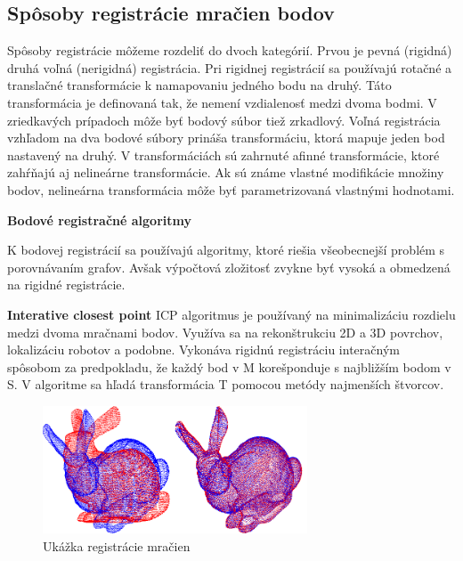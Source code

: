 \subsection{Spôsoby registrácie mračien bodov}

Spôsoby registrácie môžeme rozdeliť do dvoch kategórií. Prvou je pevná (rigidná) druhá voľná (nerigidná) registrácia. Pri rigidnej registrácií sa používajú rotačné a translačné transformácie k namapovaniu jedného bodu na druhý. Táto transformácia je definovaná tak, že nemení vzdialenosť medzi dvoma bodmi. V zriedkavých prípadoch môže byť bodový súbor tiež zrkadlový. Voľná registrácia vzhľadom na dva bodové súbory prináša transformáciu, ktorá mapuje jeden bod nastavený na druhý. V transformáciách sú zahrnuté afinné transformácie, ktoré zahŕňajú aj nelineárne transformácie. Ak sú známe vlastné modifikácie množiny bodov, nelineárna transformácia môže byť parametrizovaná vlastnými hodnotami.\newline

\textbf{Bodové registračné algoritmy}

K bodovej registrácií sa používajú algoritmy, ktoré riešia všeobecnejší problém s porovnávaním grafov. Avšak výpočtová zložitosť zvykne byť vysoká a obmedzená na rigidné registrácie.\newline


\textbf{Interative closest point}
ICP algoritmus je používaný na minimalizáciu rozdielu medzi dvoma mračnami bodov. Využíva sa na rekonštrukciu 2D a 3D povrchov, lokalizáciu robotov a podobne. Vykonáva rigidnú registráciu interačným spôsobom za predpokladu, že každý bod v M korešponduje s najbližším bodom v S. V algoritme sa hľadá transformácia T pomocou metódy najmenších štvorcov.

\begin{figure}[h]

	\centering

	\includegraphics[width=0.7\textwidth]{figures/icp_principle.png} 

	\caption{Ukážka registrácie mračien}
	\label{fig:icp_principle}

\end{figure}

